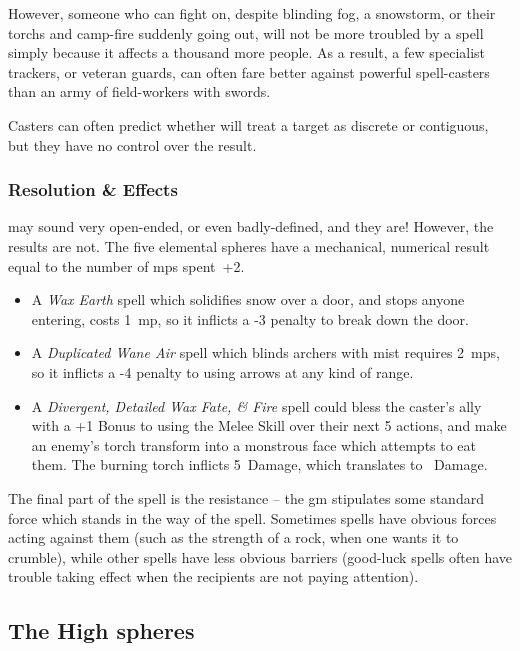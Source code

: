 \begin{multicols}{2}
{  However, someone who can fight on, despite blinding fog, a snowstorm, or their \glspl{torch} and camp-fire suddenly going out, will not be more troubled by a spell simply because it affects a thousand more people.
  As a result, a few specialist trackers, or veteran \glspl{guard}, can often fare better against powerful spell-casters than an army of field-workers with swords.}

Casters can often predict whether  will treat a target as discrete or contiguous, but they have no control over the result.

\subsubsection{Resolution \& Effects}
may sound very open-ended, or even badly-defined, and they are!
However, the results are not.
The five elemental \glspl{sphere} have a mechanical, numerical result equal to the number of \glspl{mp} spent~+2.

\begin{itemize}
  \item
  A \textit{Wax Earth} spell which solidifies snow over a door, and stops anyone entering, costs 1~\gls{mp}, so it inflicts a -3 penalty to break down the door.
  \item
  A \textit{Duplicated Wane Air} spell which blinds archers with mist requires 2~\glspl{mp}, so it inflicts a -4 penalty to using arrows at any kind of range.
  \item
  A \textit{Divergent, Detailed Wax Fate, \& Fire} spell could bless the caster's ally with a +1 Bonus to using the Melee Skill over their next 5 actions, and make an enemy's \gls{torch} transform into a monstrous face which attempts to eat them.
  The burning \gls{torch} inflicts 5~Damage, which translates to ~Damage.%
\end{itemize}

The final part of the spell is the resistance -- the \gls{gm} stipulates some standard force which stands in the way of the spell.
Sometimes spells have obvious forces acting against them (such as the strength of a rock, when one wants it to crumble), while other spells have less obvious barriers (good-luck spells often have trouble taking effect when the recipients are not paying attention).

\subsection{The High \glspl{sphere}}


\end{multicols}

